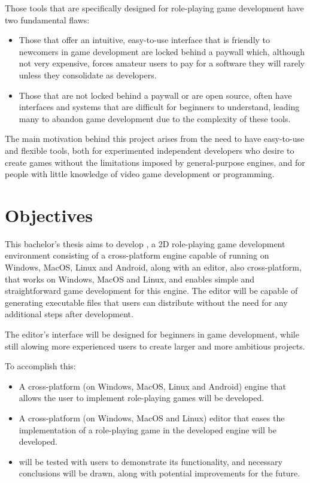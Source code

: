 Those tools that are specifically designed for role-playing game development have two fundamental flaws:
\begin{itemize}
	\item Those that offer an intuitive, easy-to-use interface that is friendly to newcomers in game development are locked behind a paywall which, although not very expensive, forces amateur users to pay for a software they will rarely unless they consolidate as developers.
	\item Those that are not locked behind a paywall or are open source, often have interfaces and systems that are difficult for beginners to understand, leading many to abandon game development due to the complexity of these tools.
\end{itemize}

\medskip

The main motivation behind this project arises from the need to have easy-to-use and flexible tools, both for experimented independent developers who desire to create games without the limitations imposed by general-purpose engines, and for people with little knowledge of video game development or programming.

\section*{Objectives}
This bachelor's thesis aims to develop \baker, a 2D role-playing game development environment consisting of a cross-platform engine capable of running on Windows, MacOS, Linux and Android, along with an editor, also cross-platform, that works on Windows, MacOS and Linux, and enables simple and straightforward game development for this engine. The editor will be capable of generating executable files that users can distribute without the need for any additional steps after development.

\smallskip

The editor's interface will be designed for beginners in game development, while still alowing more experienced users to create larger and more ambitious projects.

\medskip

To accomplish this:
\begin{itemize}
	\item A cross-platform (on Windows, MacOS, Linux and Android) engine that allows the user to implement role-playing games will be developed.
	\item A cross-platform (on Windows, MacOS and Linux) editor that eases the implementation of a role-playing game in the developed engine will be developed.
	\item \baker{} will be tested with users to demonstrate its functionality, and necessary conclusions will be drawn, along with potential improvements for the future.
\end{itemize}


